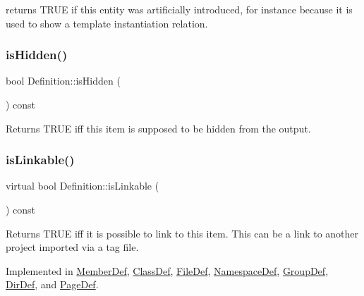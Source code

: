 returns T\+R\+UE if this entity was artificially introduced, for instance because it is used to show a template instantiation relation. \mbox{\label{class_definition_a4f303fc4a5c9be7ab8160cf1792e7bda}} 
\subsubsection{\texorpdfstring{isHidden()}{isHidden()}}
{\footnotesize\ttfamily bool Definition\+::is\+Hidden (\begin{DoxyParamCaption}{ }\end{DoxyParamCaption}) const}

Returns T\+R\+UE iff this item is supposed to be hidden from the output. \mbox{\label{class_definition_a4002fd79c2d4dcf667c37c83d4214deb}} 
\subsubsection{\texorpdfstring{isLinkable()}{isLinkable()}}
{\footnotesize\ttfamily virtual bool Definition\+::is\+Linkable (\begin{DoxyParamCaption}{ }\end{DoxyParamCaption}) const\hspace{0.3cm}{\ttfamily [pure virtual]}}

Returns T\+R\+UE iff it is possible to link to this item. This can be a link to another project imported via a tag file. 

Implemented in \mbox{\hyperlink{class_member_def_a2a703ac083e9314dc800df330f3eb683}{Member\+Def}}, \mbox{\hyperlink{class_class_def_ab42c120a9326e77882857bc53ab2b7e0}{Class\+Def}}, \mbox{\hyperlink{class_file_def_a4d175f205d548fa28fc9c5aed8095aee}{File\+Def}}, \mbox{\hyperlink{class_namespace_def_a733e21e2422707a338b42b2c4e2ab37b}{Namespace\+Def}}, \mbox{\hyperlink{class_group_def_a6aeb6d9849dfceb7809cfbda4bfb2503}{Group\+Def}}, \mbox{\hyperlink{class_dir_def_a7f8f2ffe405a82ee00982ccf7d1fd750}{Dir\+Def}}, and \mbox{\hyperlink{class_page_def_acb0b424141cbb7c1b6b5a52769cf7b06}{Page\+Def}}.

\mbox{\label{class_definition_a845891c7206d40c3664b562636cdf9fc}} 
